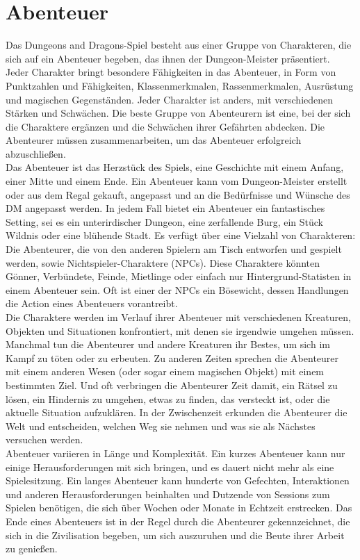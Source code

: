\section{Abenteuer}
Das Dungeons and Dragons-Spiel besteht aus einer Gruppe von Charakteren, die sich auf ein Abenteuer begeben, das ihnen der Dungeon-Meister präsentiert. Jeder Charakter bringt besondere Fähigkeiten in das Abenteuer, in Form von Punktzahlen und Fähigkeiten, Klassenmerkmalen, Rassenmerkmalen, Ausrüstung und magischen Gegenständen. Jeder Charakter ist anders, mit verschiedenen Stärken und Schwächen. Die beste Gruppe von Abenteurern ist eine, bei der sich die Charaktere ergänzen und die Schwächen ihrer Gefährten abdecken. Die Abenteurer müssen zusammenarbeiten, um das Abenteuer erfolgreich abzuschließen.\\
Das Abenteuer ist das Herzstück des Spiels, eine Geschichte mit einem Anfang, einer Mitte und einem Ende. Ein Abenteuer kann vom Dungeon-Meister erstellt oder aus dem Regal gekauft, angepasst und an die Bedürfnisse und Wünsche des DM angepasst werden. In jedem Fall bietet ein Abenteuer ein fantastisches Setting, sei es ein unterirdischer Dungeon, eine zerfallende Burg, ein Stück Wildnis oder eine blühende Stadt. Es verfügt über eine Vielzahl von Charakteren: Die Abenteurer, die von den anderen Spielern am Tisch entworfen und gespielt werden, sowie Nichtspieler-Charaktere (NPCs). Diese Charaktere könnten Gönner, Verbündete, Feinde, Mietlinge oder einfach nur Hintergrund-Statisten in einem Abenteuer sein. Oft ist einer der NPCs ein Bösewicht, dessen Handlungen die Action eines Abenteuers vorantreibt.\\
Die Charaktere werden im Verlauf ihrer Abenteuer mit verschiedenen Kreaturen, Objekten und Situationen konfrontiert, mit denen sie irgendwie umgehen müssen. Manchmal tun die Abenteurer und andere Kreaturen ihr Bestes, um sich im Kampf zu töten oder zu erbeuten. Zu anderen Zeiten sprechen die Abenteurer mit einem anderen Wesen (oder sogar einem magischen Objekt) mit einem bestimmten Ziel. Und oft verbringen die Abenteurer Zeit damit, ein Rätsel zu lösen, ein Hindernis zu umgehen, etwas zu finden, das versteckt ist, oder die aktuelle Situation aufzuklären. In der Zwischenzeit erkunden die Abenteurer die Welt und entscheiden, welchen Weg sie nehmen und was sie als Nächstes versuchen werden.\\
Abenteuer variieren in Länge und Komplexität. Ein kurzes Abenteuer kann nur einige Herausforderungen mit sich bringen, und es dauert nicht mehr als eine Spielesitzung. Ein langes Abenteuer kann hunderte von Gefechten, Interaktionen und anderen Herausforderungen beinhalten und Dutzende von Sessions zum Spielen benötigen, die sich über Wochen oder Monate in Echtzeit erstrecken. Das Ende eines Abenteuers ist in der Regel durch die Abenteurer gekennzeichnet, die sich in die Zivilisation begeben, um sich auszuruhen und die Beute ihrer Arbeit zu genießen.\\
